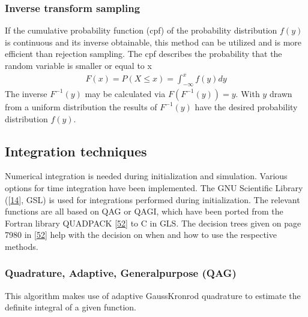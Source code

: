 \documentclass[letterpaper,10pt,english]{sphinxmanual}
\begin{document}
				\subsubsection{Inverse transform sampling}
					\label{\detokenize{NBodySimulation/Initialization:inverse-transform-sampling}}
					\sphinxAtStartPar
					If the cumulative probability function (cpf) of the probability distribution \(f(y)\) is continuous and its inverse obtainable, this method can be utilized and is more efficient than rejection sampling.
					The cpf describes the probability that the random variable is smaller or equal to x
					\begin{equation*}
					\begin{split}F(x)=P(X \leq x) = \int_{-\infty }^{x}f(y) dy\end{split}
					\end{equation*}
					\sphinxAtStartPar
					The inverse \(F^{-1}(y)\) may be calculated via \(F(F^{-1}(y)) = y\). With \(y\) drawn from a uniform distribution the results of \(F^{-1}(y)\) have the desired probability distribution \(f(y)\).

		\subsection{Integration techniques}
			\label{\detokenize{NBodySimulation/Integration:integration}}\label{\detokenize{NBodySimulation/Integration::doc}}
			\sphinxAtStartPar
			Numerical integration is needed during initialization and simulation.
			Various options for time integration have been implemented.
			The GNU Scientific Library ({[}\hyperlink{cite.NBodySimulation/Appendix:id24}{14}{]}, GSL) is used for integrations performed during initialization.
			The relevant functions are all based on QAG or QAGI, which have been ported from the Fortran library QUADPACK {[}\hyperlink{cite.NBodySimulation/Appendix:id25}{52}{]} to C in GLS.
			The decision trees given on page 79\sphinxhyphen{}80 in {[}\hyperlink{cite.NBodySimulation/Appendix:id25}{52}{]} help with the decision on when and how to use the respective methods.
			
			
			\subsubsection{Quadrature, Adaptive, General\sphinxhyphen{}purpose (QAG)}
				\label{\detokenize{NBodySimulation/Integration:quadrature-adaptive-general-purpose-qag}}
				\sphinxAtStartPar
				This algorithm makes use of adaptive Gauss\sphinxhyphen{}Kronrod quadrature to estimate the definite integral of a given function.
				
\end{document}
